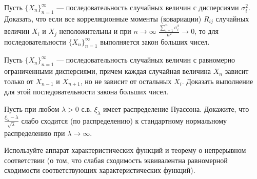 \begin{problem}
Пусть $\{ X_n\}_{n=1}^{\infty}$ --- последовательность случайных величин с дисперсиями $\sigma_i^2$. Доказать, что если все 
корреляционные моменты (ковариации) $R_{ij}$ случайных величин $X_i$ и $X_j$ неположительны и при $n\to\infty$ 
$\frac{\sum\limits_{i=1}^{n} \sigma_i^2}{n^2}\to 0$, то для последовательности $\{ X_n\}_{n=1}^{\infty}$ выполняется закон больших чисел. 
\end{problem}

\begin{problem}
Пусть $\{ X_n\}_{n=1}^{\infty}$ --- последовательность случайных величин с равномерно ограниченными дисперсиями, причем каждая 
случайная величина $X_n$ зависит только от $X_{n-1}$ и $X_{n+1}$, но не зависит от остальных $X_i$. Доказать выполнение для этой 
последовательности закона больших чисел.
\end{problem}


\begin{problem}
Пусть при любом $\lambda >0$ с.в. $\xi _{\lambda } $ имеет распределение Пуассона. Докажите, что $\frac{\xi _{\lambda } -\lambda }{\sqrt{\lambda } } $ слабо сходится (по распределению) к стандартному нормальному распределению при $\lambda \to \infty $.

\begin{ordre}
 Используйте аппарат характеристических функций и теорему о непрерывном соответствии (о том, что слабая сходимость эквивалентна равномерной сходимости соответствующих характеристических функций).
 \end{ordre}
\end{problem}


